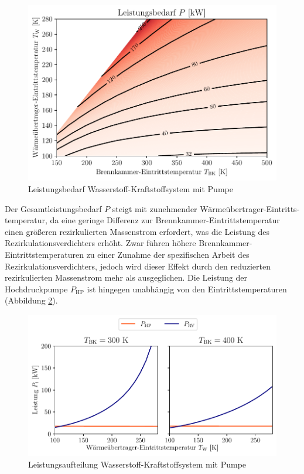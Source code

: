 \begin{figure}[ht]
\centering
\includegraphics[width=0.95\linewidth]{4_Abbildungen/2_Hauptteil/Ergebnisse/Pumpepowercontour.pdf}
  \caption{Leistungsbedarf Wasserstoff-Kraftstoffsystem mit Pumpe}
  \label{fig:pumppower}
\end{figure}
\FloatBarrier

Der Gesamtleistungsbedarf $P$ steigt mit zunehmender Wärmeübertrager-Eintritts-temperatur, da eine geringe Differenz zur Brennkammer-Eintrittstemperatur einen größeren rezirkulierten Massenstrom erfordert, was die Leistung des Rezirkulationsverdichters erhöht. Zwar führen höhere Brennkammer-Eintrittstemperaturen zu einer Zunahme der spezifischen Arbeit des Rezirkulationsverdichters, jedoch wird dieser Effekt durch den reduzierten rezirkulierten Massenstrom mehr als ausgeglichen. Die Leistung der Hochdruckpumpe $P_\mathrm{HP}$ ist hingegen unabhängig von den Eintrittstemperaturen (Abbildung \ref{fig:pumpsplit}). 

\begin{figure}[ht]
\centering
\includegraphics[width=1\linewidth]{4_Abbildungen/2_Hauptteil/Ergebnisse/Pumpe_powersplit.pdf}
  \caption{Leistungsaufteilung Wasserstoff-Kraftstoffsystem mit Pumpe}
  \label{fig:pumpsplit}
\end{figure}
\FloatBarrier

